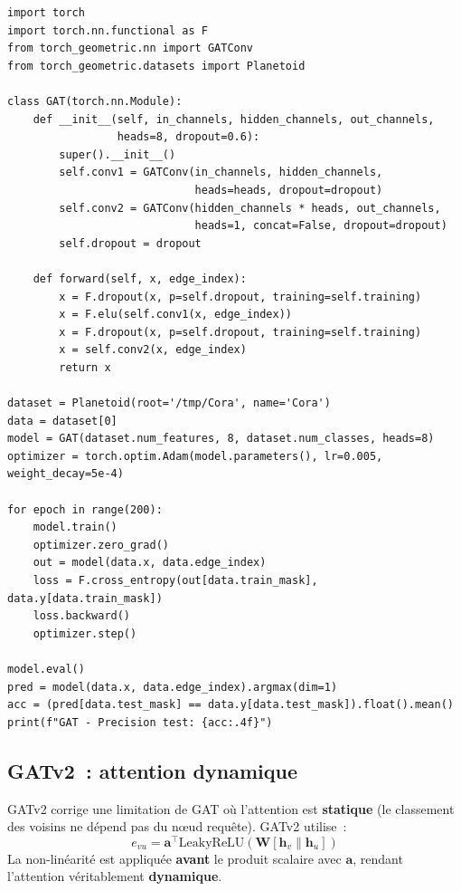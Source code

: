 \begin{codeblock}[title=\textbf{Impl\'ementation GAT avec PyTorch Geometric}]
\begin{verbatim}
import torch
import torch.nn.functional as F
from torch_geometric.nn import GATConv
from torch_geometric.datasets import Planetoid

class GAT(torch.nn.Module):
    def __init__(self, in_channels, hidden_channels, out_channels,
                 heads=8, dropout=0.6):
        super().__init__()
        self.conv1 = GATConv(in_channels, hidden_channels,
                             heads=heads, dropout=dropout)
        self.conv2 = GATConv(hidden_channels * heads, out_channels,
                             heads=1, concat=False, dropout=dropout)
        self.dropout = dropout

    def forward(self, x, edge_index):
        x = F.dropout(x, p=self.dropout, training=self.training)
        x = F.elu(self.conv1(x, edge_index))
        x = F.dropout(x, p=self.dropout, training=self.training)
        x = self.conv2(x, edge_index)
        return x

dataset = Planetoid(root='/tmp/Cora', name='Cora')
data = dataset[0]
model = GAT(dataset.num_features, 8, dataset.num_classes, heads=8)
optimizer = torch.optim.Adam(model.parameters(), lr=0.005, weight_decay=5e-4)

for epoch in range(200):
    model.train()
    optimizer.zero_grad()
    out = model(data.x, data.edge_index)
    loss = F.cross_entropy(out[data.train_mask], data.y[data.train_mask])
    loss.backward()
    optimizer.step()

model.eval()
pred = model(data.x, data.edge_index).argmax(dim=1)
acc = (pred[data.test_mask] == data.y[data.test_mask]).float().mean()
print(f"GAT - Precision test: {acc:.4f}")
\end{verbatim}
\end{codeblock}

\subsection{GATv2~: attention dynamique}

\begin{definition}
GATv2 corrige une limitation de GAT o\`u l'attention est \textbf{statique}
(le classement des voisins ne d\'epend pas du n\oe ud requête). GATv2 utilise~:
\[
    e_{vu} = \mathbf{a}^\top \text{LeakyReLU}\!\left(\mathbf{W}\!\left[
    \mathbf{h}_v \| \mathbf{h}_u\right]\right)
\]
La non-lin\'earit\'e est appliqu\'ee \textbf{avant} le produit scalaire avec
$\mathbf{a}$, rendant l'attention v\'eritablement \textbf{dynamique}.
\end{definition}


